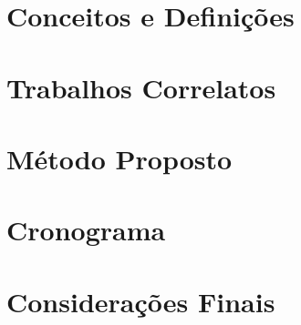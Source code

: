 \documentclass[
    12pt,       %
    oneside,    %
    a4paper,    %
%
    chapter=TITLE,	  	  %
%
    english,			  %
    brazil				  %
%
]{abntex2}
\begin{document}
\chapter{Conceitos e Definições}
\label{ch:fundamentacao}


\chapter{Trabalhos Correlatos}
\label{ch:correlatos}



\chapter{Método Proposto}
\label{chapter:metodo}


\chapter{Cronograma}
\label{ch:cronograma}
%

\chapter{Considerações Finais}
\label{ch:consideracoes}
%
%


\printindex
\end{document}
